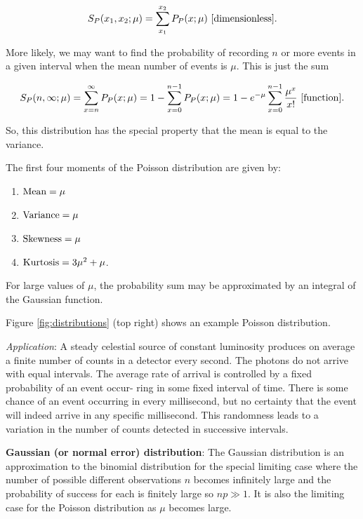 \documentclass[a4paper,10pt]{article}
\begin{document}
\begin{align*}
    S_P(x_1,x_2;\mu) = \sum_{x_1}^{x_2} P_P(x;\mu) ~ [{\rm dimensionless}].
\end{align*}

{\noindent}More likely, we may want to find the probability of recording $n$ or more events in a given interval when the mean number of events is $\mu$. This is just the sum 

\begin{align*}
    S_P(n,\infty;\mu) = \sum_{x=n}^\infty P_P(x;\mu)= 1-\sum_{x=0}^{n-1} P_P(x;\mu) = 1-e^{-\mu} \sum_{x=0}^{n-1} \frac{\mu^x}{x!} ~ [{\rm function}].
\end{align*}

{\noindent}So, this distribution has the special property that the mean is equal to the variance.

{\noindent}The first four moments of the Poisson distribution are given by:

\begin{enumerate}
    \item ${\rm Mean} = \mu$
    \item ${\rm Variance} = \mu$
    \item ${\rm Skewness} = \mu$
    \item ${\rm Kurtosis} = 3\mu^2+\mu$.
\end{enumerate}

{\noindent}For large values of $\mu$, the probability sum may be approximated by an integral of the Gaussian function.

{\noindent}Figure \ref{fig:distributions} (top right) shows an example Poisson distribution.

{\noindent}\textit{Application}: A steady celestial source of constant luminosity produces on average a finite number of counts in a detector every second. The photons do not arrive with equal intervals. The average rate of arrival is controlled by a fixed probability of an event occur- ring in some fixed interval of time. There is some chance of an event occurring in every millisecond, but no certainty that the event will indeed arrive in any specific millisecond. This randomness leads to a variation in the number of counts detected in successive intervals.

{\noindent}\textbf{Gaussian (or normal error) distribution}: The Gaussian distribution is an approximation to the binomial distribution for the special limiting case where the number of possible different observations $n$ becomes infinitely large and the probability of success for each is finitely large so $np\gg1$. It is also the limiting case for the Poisson distribution as $\mu$ becomes large.
\end{document}
